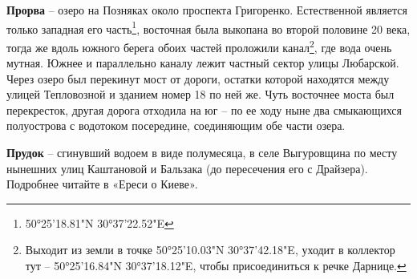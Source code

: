 \textbf{Прорва} – озеро на Позняках около проспекта Григоренко. Естественной является только западная его часть\footnote{50°25'18.81"N 30°37'22.52"E}, восточная была выкопана во второй половине 20 века, тогда же вдоль южного берега обоих частей проложили канал\footnote{Выходит из земли в точке 50°25'10.03"N 30°37'42.18"E, уходит в коллектор тут – 50°25'16.84"N 30°37'18.12"E, чтобы присоединиться к речке Дарнице.}, где вода очень мутная. Южнее и параллельно каналу лежит частный сектор улицы Любарской. Через озеро был перекинут мост от дороги, остатки которой находятся между улицей Тепловозной и зданием номер 18 по ней же. Чуть восточнее моста был перекресток, другая дорога отходила на юг – по ее ходу ныне два смыкающихся полуострова с водотоком посередине, соединяющим обе части озера.\\

\medskip


\textbf{Прудок} – сгинувший водоем в виде полумесяца, в селе Выгуровщина по месту нынешних улиц Каштановой и Бальзака (до пересечения его с Драйзера). Подробнее читайте в «Ереси о Киеве».